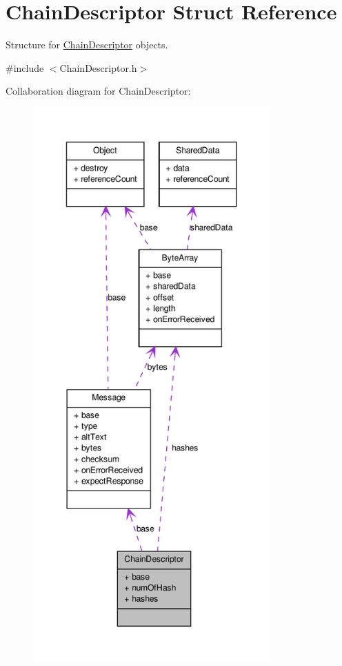 \hypertarget{struct_chain_descriptor}{
\section{ChainDescriptor Struct Reference}
\label{struct_chain_descriptor}
}


Structure for \hyperlink{struct_chain_descriptor}{ChainDescriptor} objects.  




{\ttfamily \#include $<$ChainDescriptor.h$>$}



Collaboration diagram for ChainDescriptor:
\nopagebreak
\begin{figure}[H]
\begin{center}
\leavevmode
\includegraphics[height=600pt]{struct_chain_descriptor__coll__graph}
\end{center}
\end{figure}
